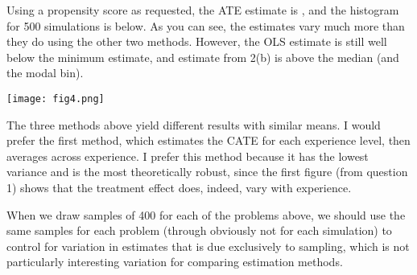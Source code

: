 \documentclass{article}
\begin{document}
Using a propensity score as requested, the ATE estimate is , and the histogram for 500 simulations is below. As you can see, the estimates vary much more than they do using the other two methods. However, the OLS estimate is still well below the minimum estimate, and estimate from 2(b) is above the median (and the modal bin).
\begin{center}
    \texttt{[image: fig4.png]}
\end{center}
The three methods above yield different results with similar means. I would prefer the first method, which estimates the CATE for each experience level, then averages across experience. I prefer this method because it has the lowest variance and is the most theoretically robust, since the first figure (from question 1) shows that the treatment effect does, indeed, vary with experience.

When we draw samples of 400 for each of the problems above, we should use the same samples for each problem (through obviously not for each simulation) to control for variation in estimates that is due exclusively to sampling, which is not particularly interesting variation for comparing estimation methods.
\end{document}
